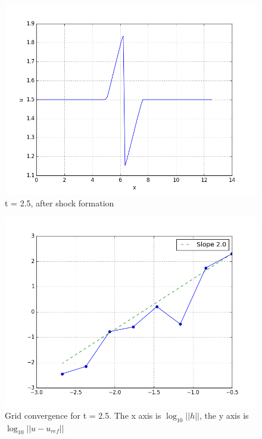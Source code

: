 \documentclass{article}
\begin{document}
\begin{figure}
	\includegraphics[scale=0.5]{hp-sol-n100-t25}
	\caption{t = 2.5, after shock formation}
\end{figure}
 
\begin{figure}
	\includegraphics[scale=0.5]{hp-t25-grids8}
	\caption{Grid convergence for t = 2.5. The x axis is $\log_{10}||h||$, the y axis is $\log_{10}||u-u_{ref}||$}
\end{figure}
 
\end{document}
